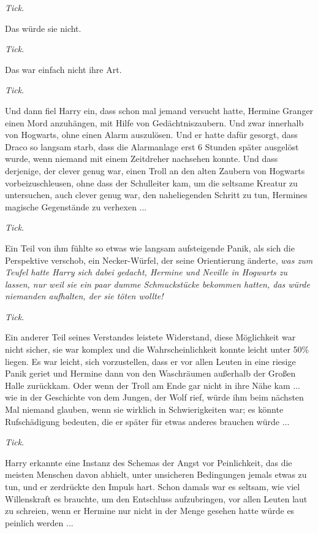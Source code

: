 \emph{Tick}.

Das würde sie nicht.

\emph{Tick}.

Das war einfach nicht ihre Art.

\emph{Tick}.

Und dann fiel Harry ein, dass schon mal jemand versucht hatte, Hermine Granger
einen Mord anzuhängen, mit Hilfe von Gedächtniszaubern. Und zwar innerhalb von
Hogwarts, ohne einen Alarm auszulösen. Und er hatte dafür gesorgt, dass Draco so
langsam starb, dass die Alarmanlage erst 6 Stunden später ausgelöst wurde, wenn
niemand mit einem Zeitdreher nachsehen konnte. Und dass derjenige, der clever
genug war, einen Troll an den alten Zaubern von Hogwarts vorbeizuschleusen, ohne
dass der Schulleiter kam, um die seltsame Kreatur zu untersuchen, auch clever
genug war, den naheliegenden Schritt zu tun, Hermines magische Gegenstände zu
verhexen ...

\emph{Tick}.

Ein Teil von ihm fühlte so etwas wie langsam aufsteigende Panik, als sich die
Perspektive verschob, ein Necker-Würfel, der seine Orientierung änderte,
\emph{was zum Teufel hatte Harry sich dabei gedacht, Hermine und Neville in
Hogwarts zu lassen, nur weil sie ein paar dumme Schmuckstücke bekommen hatten,
das würde niemanden aufhalten, der sie töten wollte!}

\emph{Tick}.

Ein anderer Teil seines Verstandes leistete Widerstand, diese Möglichkeit war
nicht sicher, sie war komplex und die Wahrscheinlichkeit konnte leicht unter
50\% liegen. Es war leicht, sich vorzustellen, dass er vor allen Leuten in eine
riesige Panik geriet und Hermine dann von den Waschräumen außerhalb der Großen
Halle zurückkam. Oder wenn der Troll am Ende gar nicht in ihre Nähe kam ... wie
in der Geschichte von dem Jungen, der Wolf rief, würde ihm beim nächsten Mal
niemand glauben, wenn sie wirklich in Schwierigkeiten war; es könnte
Rufschädigung bedeuten, die er später für etwas anderes brauchen würde ...

\emph{Tick}.

Harry erkannte eine Instanz des Schemas der Angst vor Peinlichkeit, das die
meisten Menschen davon abhielt, unter unsicheren Bedingungen jemals etwas zu
tun, und er zerdrückte den Impuls hart. Schon damals war es seltsam, wie viel
Willenskraft es brauchte, um den Entschluss aufzubringen, vor allen Leuten laut
zu schreien, wenn er Hermine nur nicht in der Menge gesehen hatte würde es
peinlich werden ...

